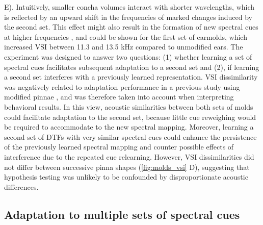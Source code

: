 E). Intuitively, smaller concha volumes interact with shorter wavelengths, which is reflected by an upward shift in the frequencies of marked changes induced by the second set. This effect might also result in the formation of new spectral cues at higher frequencies \citep{wanrooij_relearning_2005}, and could be shown for the first set of earmolds, which increased VSI between 11.3 and 13.5 kHz compared to unmodified ears. The experiment was designed to answer two questions: (1) whether learning a set of spectral cues facilitates subsequent adaptation to a second set and (2), if learning a second set interferes with a previously learned representation. VSI dissimilarity was negatively related to adaptation performance in a previous study using modified pinnae \citep{trapeau_fast_2016}, and was therefore taken into account when interpreting behavioral results. In this view, acoustic similarities between both sets of molds could facilitate adaptation to the second set, because little cue reweighing would be required to accommodate to the new spectral mapping. Moreover, learning a second set of DTFs with very similar spectral cues could enhance the persistence of the previously learned spectral mapping and counter possible effects of interference due to the repeated cue relearning. However, VSI dissimilarities did not differ between successive pinna shapes (\cref{fig:molds_vsi} D), suggesting that hypothesis testing was unlikely to be confounded by disproportionate acoustic differences. 

\subsection{Adaptation to multiple sets of spectral cues}

